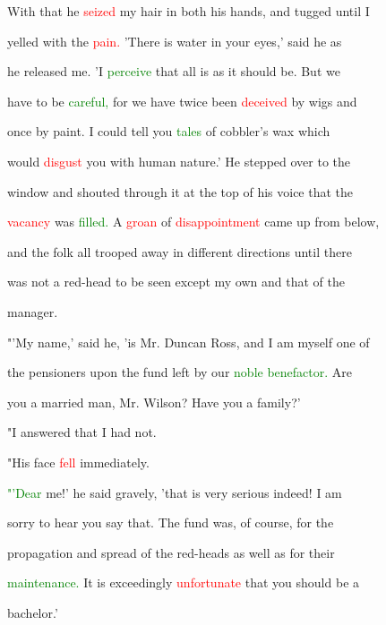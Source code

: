  With that he \textcolor{red}{seized} my hair in both his hands, and tugged until I

 \textcolor{BurntOrange}{yelled} with the \textcolor{red}{pain.} 'There is water in your eyes,' said he as

 he released me. 'I \textcolor{green}{perceive} that all is as it should be. But we

 have to be \textcolor{green}{careful,} for we have twice been \textcolor{red}{deceived} by wigs and

 once by paint. I could tell you \textcolor{green}{tales} of cobbler's wax which

 would \textcolor{red}{disgust} you with human nature.' He stepped over to the

 window and \textcolor{BurntOrange}{shouted} through it at the \textcolor{BurntOrange}{top} of his voice that the

 \textcolor{red}{vacancy} was \textcolor{green}{filled.} A \textcolor{red}{groan} of \textcolor{red}{disappointment} came up from below,

 and the folk all trooped away in different directions until there

 was not a red-head to be seen except my own and that of the

 manager.



 "'My name,' said he, 'is Mr. Duncan Ross, and I am myself one of

 the pensioners upon the fund left by our \textcolor{green}{noble} \textcolor{green}{benefactor.} Are

 you a married man, Mr. Wilson? Have you a family?'



 "I answered that I had not.



 "His face \textcolor{red}{fell} \textcolor{BurntOrange}{immediately.}



 \textcolor{green}{"'Dear} me!' he said gravely, 'that is very serious indeed! I am

 sorry to hear you say that. The fund was, of course, for the

 propagation and spread of the red-heads as well as for their

 \textcolor{green}{maintenance.} It is exceedingly \textcolor{red}{unfortunate} that you should be a

 bachelor.'



